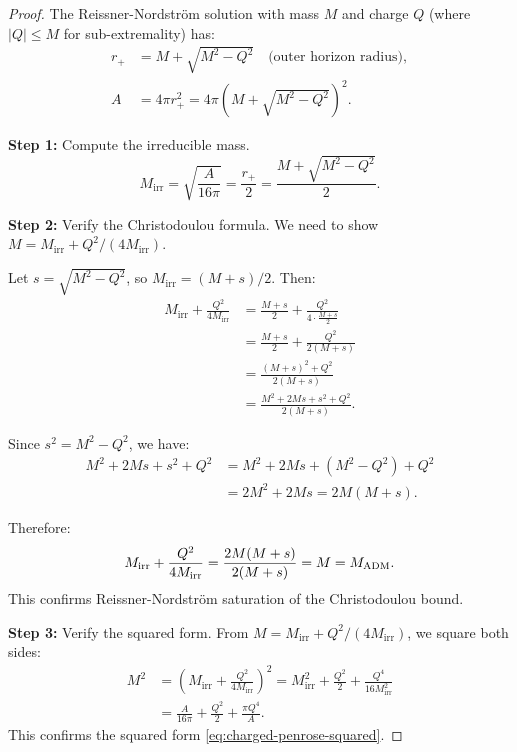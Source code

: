 \begin{proof}
The Reissner-Nordstr\"om solution with mass $M$ and charge $Q$ (where $|Q| \leq M$ for sub-extremality) has:
\begin{align}
    r_+ &= M + \sqrt{M^2 - Q^2} \quad \text{(outer horizon radius)}, \\
    A &= 4\pi r_+^2 = 4\pi(M + \sqrt{M^2 - Q^2})^2.
\end{align}

\textbf{Step 1:} Compute the irreducible mass.
\[
M_{\mathrm{irr}} = \sqrt{\frac{A}{16\pi}} = \frac{r_+}{2} = \frac{M + \sqrt{M^2 - Q^2}}{2}.
\]

\textbf{Step 2:} Verify the Christodoulou formula.
We need to show $M = M_{\mathrm{irr}} + Q^2/(4M_{\mathrm{irr}})$.

Let $s = \sqrt{M^2 - Q^2}$, so $M_{\mathrm{irr}} = (M + s)/2$. Then:
\begin{align}
M_{\mathrm{irr}} + \frac{Q^2}{4M_{\mathrm{irr}}} &= \frac{M + s}{2} + \frac{Q^2}{4 \cdot \frac{M+s}{2}} \\
&= \frac{M + s}{2} + \frac{Q^2}{2(M+s)} \\
&= \frac{(M + s)^2 + Q^2}{2(M+s)} \\
&= \frac{M^2 + 2Ms + s^2 + Q^2}{2(M+s)}.
\end{align}

Since $s^2 = M^2 - Q^2$, we have:
\begin{align}
M^2 + 2Ms + s^2 + Q^2 &= M^2 + 2Ms + (M^2 - Q^2) + Q^2 \\
&= 2M^2 + 2Ms = 2M(M + s).
\end{align}

Therefore:
\[
M_{\mathrm{irr}} + \frac{Q^2}{4M_{\mathrm{irr}}} = \frac{2M(M + s)}{2(M+s)} = M = M_{\mathrm{ADM}}.
\]
This confirms Reissner-Nordstr\"om saturation of the Christodoulou bound.

\textbf{Step 3:} Verify the squared form.
From $M = M_{\mathrm{irr}} + Q^2/(4M_{\mathrm{irr}})$, we square both sides:
\begin{align}
M^2 &= \left(M_{\mathrm{irr}} + \frac{Q^2}{4M_{\mathrm{irr}}}\right)^2 = M_{\mathrm{irr}}^2 + \frac{Q^2}{2} + \frac{Q^4}{16M_{\mathrm{irr}}^2} \\
&= \frac{A}{16\pi} + \frac{Q^2}{2} + \frac{\pi Q^4}{A}.
\end{align}
This confirms the squared form \eqref{eq:charged-penrose-squared}.
\end{proof}

